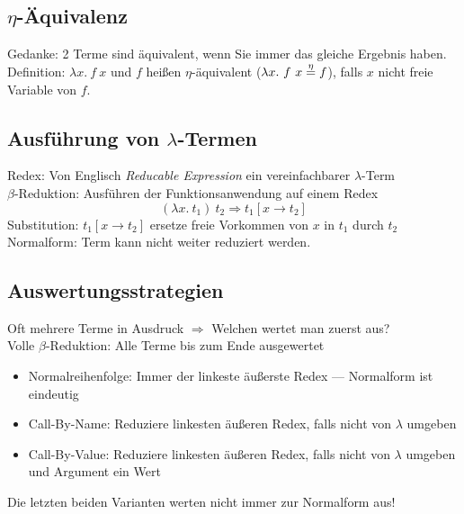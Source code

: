 \subsection{\(\eta\)-Äquivalenz}%
\label{tg:sub:eta-aequivalenz}
Gedanke: 2 Terme sind äquivalent, wenn Sie immer das gleiche Ergebnis haben.\\
Definition: \(\lambda x.\ f\ x\) und \(f\) heißen \(\eta\)-äquivalent (\(\lambda x.\ f\ x \overset{\eta}{=} f\)), falls \(x\)
nicht freie Variable von \(f\).

\subsection{Ausführung von \(\lambda\)-Termen}%
\label{tg:sub:ausfuehrung-von-lambda-termen}
Redex: Von Englisch \textit{Reducable Expression} ein vereinfachbarer \(\lambda\)-Term\\
\(\beta\)-Reduktion: Ausführen der Funktionsanwendung auf einem Redex \[(\lambda x.\ t_1)\ t_2 \Rightarrow t_1 [x \rightarrow t_2]\]
Substitution: \(t_1 [x \rightarrow t_2]\) ersetze freie Vorkommen von \(x\) in \(t_1\) durch \(t_2\)\\
Normalform: Term kann nicht weiter reduziert werden.

\newpage
\subsection{Auswertungsstrategien}%
\label{tg:sub:auswertungsstrategien}
Oft mehrere Terme in Ausdruck \(\Rightarrow\) Welchen wertet man zuerst aus?\\
Volle \(\beta\)-Reduktion: Alle Terme bis zum Ende ausgewertet
\begin{itemize}
  \item Normalreihenfolge: Immer der linkeste äußerste Redex --- Normalform ist eindeutig
  \item Call-By-Name: Reduziere linkesten äußeren Redex, falls nicht von \(\lambda\) umgeben
  \item Call-By-Value: Reduziere linkesten äußeren Redex, falls nicht von \(\lambda\) umgeben und Argument ein Wert
\end{itemize}
Die letzten beiden Varianten werten nicht immer zur Normalform aus!

